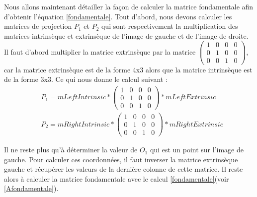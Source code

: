 \documentclass[a4paper,10pt]{article}
\begin{document}
Nous allons maintenant détailler la façon de calculer la matrice fondamentale afin
d'obtenir l'équation \eqref{fondamentale}. Tout d'abord, nous devons calculer
les matrices de projection $P_1$ et $P_2$ qui sont respectivement la multiplication des matrices
intrinsèque et extrinsèque de l'image de gauche et de l'image de droite. Il faut
d'abord multiplier la matrice extrinsèque par la matrice $\begin{pmatrix} 1&0&0&0\\0&1&0&0\\0&0&1&0\end{pmatrix}$,
car la matrice extrinsèque est de la forme 4x3 alors que la matrice intrinsèque est de la forme
3x3. Ce qui nous donne le calcul suivant :
\begin{align}
 &P_1 = mLeftIntrinsic * \begin{pmatrix} 1&0&0&0\\0&1&0&0\\0&0&1&0\end{pmatrix} * mLeftExtrinsic\\
 &P_2 = mRightIntrinsic * \begin{pmatrix} 1&0&0&0\\0&1&0&0\\0&0&1&0\end{pmatrix} * mRightExtrinsic
 \label{matriceP}
\end{align}

Il ne reste plus qu'à déterminer la valeur de $O_1$ qui est un point sur l'image de gauche.
Pour calculer ces coordonnées, il faut inverser la matrice extrinsèque gauche et récupérer
les valeurs de la dernière colonne de cette matrice. Il reste alors à calculer la matrice
fondamentale avec le calcul \eqref{fondamentale}(voir \ref{Afondamentale}).
\end{document}
